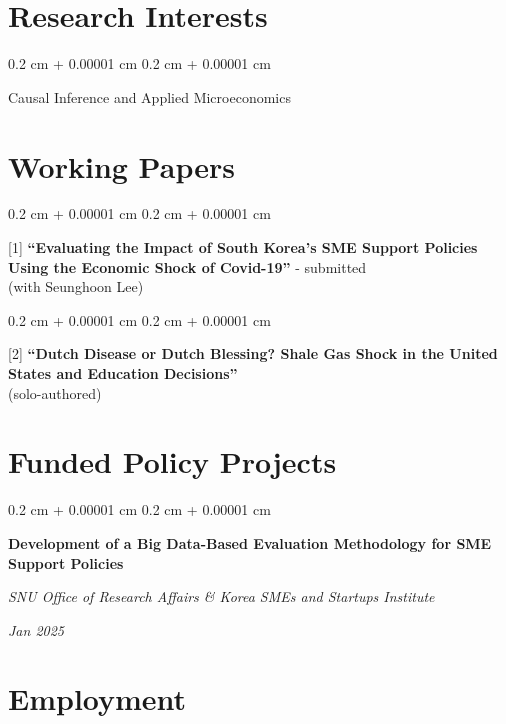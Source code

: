 \documentclass[10pt, letterpaper]{article}
\newenvironment{onecolentry}{
	\begin{adjustwidth}{
			0.2 cm + 0.00001 cm
		}{
			0.2 cm + 0.00001 cm
		}
	}{
	\end{adjustwidth}
} %
\newenvironment{twocolentry}[2][]{
	\onecolentry
	\def\secondColumn{#2}
	\setcolumnwidth{\fill, 4.5 cm}
	\begin{paracol}{2}
	}{
		\switchcolumn \raggedleft \secondColumn
	\end{paracol}
	\endonecolentry
} %
\begin{document}
	
	
	
		\section{Research Interests}
	
	\begin{onecolentry}
Causal Inference and Applied Microeconomics
	\end{onecolentry}
	
	\vspace{12pt}
	
	\section{Working Papers}

	\begin{onecolentry}
		[1] \textbf{``Evaluating the Impact of South Korea’s SME Support Policies Using the Economic Shock of Covid-19''} - submitted \\(with Seunghoon Lee)
	\end{onecolentry}

	\vspace{12pt}

	\begin{onecolentry}
		[2] \textbf{``Dutch Disease or Dutch Blessing? Shale Gas Shock in the United States and Education Decisions''} \\ (solo-authored)
	\end{onecolentry}

	
	\vspace{12pt}

	\section{Funded Policy Projects}

	\begin{twocolentry}
		{
			\textit{Jan 2025}    
			
			\textit{}}
		\textbf{Development of a Big Data-Based Evaluation Methodology for SME Support Policies}
		
		\textit{SNU Office of Research Affairs \& Korea SMEs and Startups Institute}
	\end{twocolentry}

	
	\vspace{12pt}

	\section{Employment}
	
\end{document}

